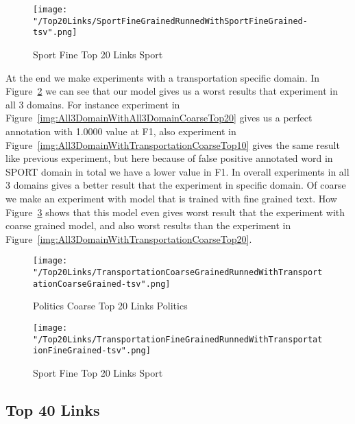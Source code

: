 \documentclass[thesis=M,english]{FITthesis}[2018/05/30]
\begin{document}
	\begin{figure}[H]\centering
		\texttt{[image: "/Top20Links/SportFineGrainedRunnedWithSportFineGrained-tsv".png]}
		\caption{Sport Fine Top 20 Links Sport}\label{img:SportWithSportFineTop20}	
	\end{figure}
	
	At the end we make experiments with a transportation specific domain. In Figure~\ref{img:TransportationWithTransportationCoarseTop20} we can see that our model gives us a worst results that experiment in all 3 domains. For instance experiment in Figure~\ref{img:All3DomainWithAll3DomainCoarseTop20} gives us a perfect annotation with 1.0000 value at F1, also experiment in Figure~\ref{img:All3DomainWithTransportationCoarseTop10} gives the same result like previous experiment, but here because of false positive annotated word in SPORT domain in total we have a lower value in F1. In overall experiments in all 3 domains gives a better result that the experiment in specific domain.
	Of coarse we make an experiment with model that is trained with fine grained text. How Figure~\ref{img:TransportationWithTransportationFineTop20} shows that this model even gives worst result that the experiment with coarse grained model, and also worst results than the experiment in Figure~\ref{img:All3DomainWithTransportationCoarseTop20}.		
	\begin{figure}[H]\centering
		\texttt{[image: "/Top20Links/TransportationCoarseGrainedRunnedWithTransportationCoarseGrained-tsv".png]}
		\caption{Politics Coarse Top 20 Links Politics}\label{img:TransportationWithTransportationCoarseTop20}
	\end{figure}		

	\begin{figure}[H]\centering
		\texttt{[image: "/Top20Links/TransportationFineGrainedRunnedWithTransportationFineGrained-tsv".png]}
		\caption{Sport Fine Top 20 Links Sport}\label{img:TransportationWithTransportationFineTop20}	
	\end{figure}
	
	

\subsection{Top 40 Links}
\end{document}
